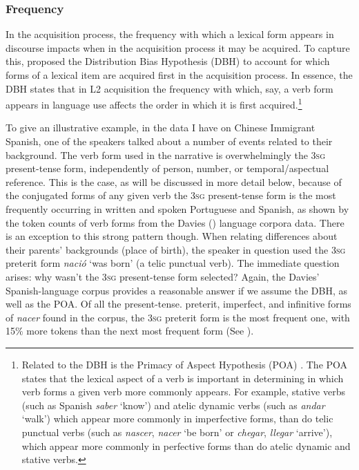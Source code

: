 \documentclass[output=paper,colorlinks,citecolor=brown]{langscibook}
\begin{document}
\subsubsection{Frequency}
In the acquisition process, the frequency with which a lexical form appears in discourse impacts when in the acquisition process it may be acquired. To capture this,  \citep{Andersen1996} proposed the Distribution Bias Hypothesis (DBH) to account for which forms of a lexical item are acquired first in the acquisition process. In essence, the DBH states that in L2 acquisition the frequency with which, say, a verb form appears in language use affects the order in which it is first acquired.\footnote{ Related to the DBH is the Primacy of Aspect Hypothesis (POA)  \citep{Andersen1993,Andersen1996}. The POA states that the lexical aspect of a verb is important in determining in which verb forms a given verb more commonly appears. For example, stative verbs (such as Spanish \textit{saber} `know') and atelic dynamic verbs (such as \textit{andar} `walk') which appear more commonly in imperfective forms, than do telic punctual verbs (such as \textit{nascer}, \textit{nacer} `be born' or \textit{chegar}, \textit{llegar} `arrive'), which appear more commonly in perfective forms than do atelic dynamic and stative verbs. }


To give an illustrative example, in the data I have on Chinese Immigrant Spanish, one of the speakers talked about a number of events related to their background. The verb form used in the narrative is overwhelmingly the 3\textsc{sg} present-tense form, independently of person, number, or temporal/aspectual reference. This is the case, as will be discussed in more detail below, because of the conjugated forms of any given verb the 3\textsc{sg}  present-tense form is the most frequently occurring in written and spoken Portuguese and Spanish, as shown by the token counts of verb forms from the Davies (\citeyear{Davies2002}) language corpora data. There is an exception to this strong pattern though. When relating differences about their parents' backgrounds (place of birth), the speaker in question used the 3\textsc{sg} preterit form \textit{nació} `was born' (a telic punctual verb). The immediate question arises: why wasn't the 3\textsc{sg} present-tense form selected? Again, the Davies' Spanish-language corpus provides a reasonable answer if we assume the DBH, as well as the POA. Of all the present-tense. preterit, imperfect, and infinitive forms of \textit{nacer} found in the corpus, the 3\textsc{sg }preterit form is the most frequent one, with 15$\%$ more tokens than the next most frequent form (See ).
\end{document}
